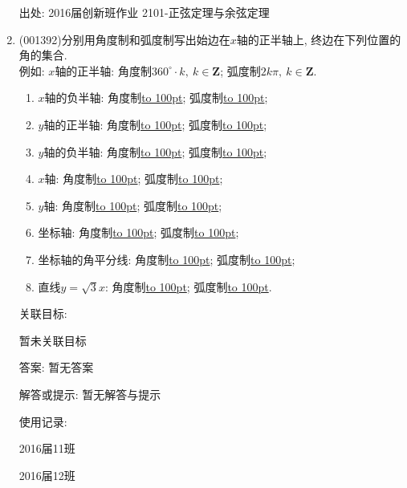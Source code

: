 \documentclass[10pt,a4paper]{article}
\newcommand{\blank}[1]{\underline{\hbox to #1pt{}}}
\begin{document}
\begin{enumerate}[1.]
出处: 2016届创新班作业	2101-正弦定理与余弦定理
\item { (001392)}分别用角度制和弧度制写出始边在$x$轴的正半轴上, 终边在下列位置的角的集合.\\ 
例如: $x$轴的正半轴: 角度制\underline{$360^\circ \cdot k, \ k\in \mathbf{Z}$}; 弧度制\underline{$2k\pi, \ k\in \mathbf{Z}$}.
\begin{enumerate}[(1)]
\item $x$轴的负半轴: 角度制\blank{100}; 弧度制\blank{100};\\ 
\item $y$轴的正半轴: 角度制\blank{100}; 弧度制\blank{100};\\ 
\item $y$轴的负半轴: 角度制\blank{100}; 弧度制\blank{100};\\ 
\item $x$轴: 角度制\blank{100}; 弧度制\blank{100};\\ 
\item $y$轴: 角度制\blank{100}; 弧度制\blank{100};\\ 
\item 坐标轴: 角度制\blank{100}; 弧度制\blank{100};\\ 
\item 坐标轴的角平分线: 角度制\blank{100}; 弧度制\blank{100};\\ 
\item 直线$y=\sqrt{3}x$: 角度制\blank{100}; 弧度制\blank{100}.\\ 
\end{enumerate}


关联目标:

暂未关联目标

答案: 暂无答案

解答或提示: 暂无解答与提示

使用记录:

2016届11班								

2016届12班								



\end{enumerate}
\end{document}
